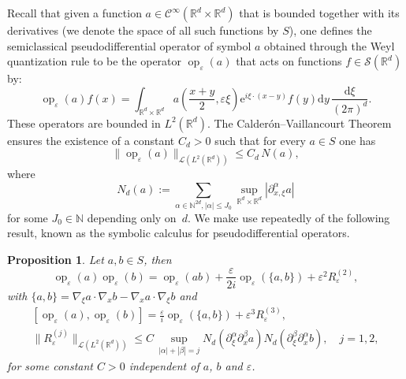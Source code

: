 \documentclass[10pt]{amsart}
\newtheorem{prop}[cdrthm]{Proposition}
\theoremstyle{definition}
\DeclareMathOperator{\op}{op}
\newcommand*\R{{\mathbb R}}
\newcommand*\N{{\mathbb N}}
\newcommand*\eps{\varepsilon}
\numberwithin{equation}{section}
\newcommand{\ee}{{\mathrm e}}
\newcommand*{\dd}{\mathrm{d}}
\newcommand*{\dy}{\dd y}
\newcommand*{\dxi}{\dd \xi}
\begin{document}

Recall that given a function $a\in\mathcal{C}^\infty(\R^d\times\R^d)$ that is bounded together with its derivatives (we denote the space of all such functions by ${S}$), one defines the semiclassical pseudodifferential operator of symbol $a$ obtained through the Weyl quantization rule to be the operator $\op_\eps(a)$ that acts on functions $f\in\mathcal{S}(\R^d)$ by:
\[
\op_\eps(a) f(x)=\int_{\R^{d}\times\R^d} a\left(\frac{x+y}{2},\eps\xi\right) {\ee}^{i \xi\cdot (x-y)} f(y)\dy\,\frac{\dxi}{(2\pi)^d}.
\]
These operators are bounded in $L^2(\R^d)$. The Calderón--Vaillancourt Theorem~\cite{CV} ensures the existence of a constant $C_d>0$ such that for every $ a\in S$ one has
\begin{equation}\label{est:pseudo}
\| \op_\eps(a)\|_{{\mathcal L}(L^2(\R^d))}\leq C_d\, N(a),
\end{equation}
where
\[
N_d(a):=\sum_{\alpha\in\N^{2d},|\alpha|\leq J_0} \sup_{\R^d\times\R^d}|\partial_{x,\xi}^\alpha a|
\]
for some $J_0\in\N$ depending only on~$d$. We make use repeatedly of the following result, known as the symbolic calculus for pseudodifferential operators.

\begin{prop}\label{prop:symbol}
Let $a,b\in S$, then
\[
\op_\eps(a)\op_\eps(b) = \op_\eps(ab)+\frac{\eps}{2i} \op_\eps(\{a,b\})+\eps^2 R^{(2)}_\eps,
\]
with $\{a,b\}=\nabla_\xi a \cdot \nabla _x b-\nabla _xa\cdot \nabla_\xi b$ and
\begin{gather*}
\left[\op_\eps(a),\op_\eps(b)\right] =\frac{\eps}{i}\op_\eps(\{a,b\}) +\eps^3 R_\eps^{(3)},
\\
\| R^{(j)}_\eps\|_{{\mathcal L}(L^2(\R^d))}\leq C \,\sup_{|\alpha|+|\beta|=j} N_d(\partial_\xi^\alpha \partial_x^{\beta} a) N_d(
\partial_\xi^\beta \partial_x^{\alpha} b),\quad j=1,2,
\end{gather*}
for some constant $C>0$ independent of $a$, $b$ and $\eps$.
\end{prop}
\end{document}
